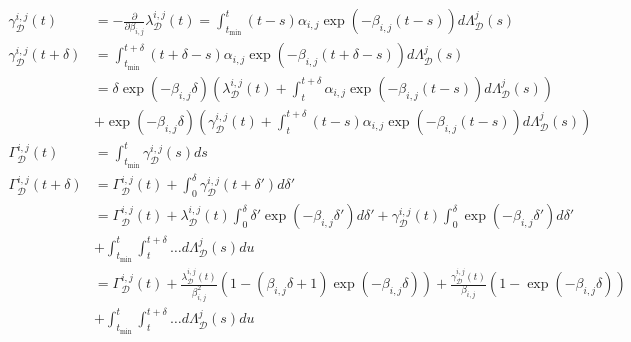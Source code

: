 \documentclass[honours,12pt]{unswthesis}
\numberwithin{equation}{section}
\begin{document}
\begin{equation*}
	\begin{align}
		\gamma_\mathcal{D}^{i,j}(t) &= -\frac{\partial}{\partial\beta_{i,j}}\lambda_\mathcal{D}^{i,j}(t) = \int_{t_\mathrm{min}}^t (t-s)\alpha_{i,j}\exp(-\beta_{i,j}(t-s))d\Lambda_\mathcal{D}^j(s) \\
		\gamma_\mathcal{D}^{i,j}(t+\delta) &= \int_{t_\mathrm{min}}^{t+\delta} (t+\delta-s)\alpha_{i,j}\exp(-\beta_{i,j}(t+\delta-s))d\Lambda_\mathcal{D}^j(s) \\
		&= \delta\exp(-\beta_{i,j}\delta) \left( \lambda_\mathcal{D}^{i,j}(t) + \int_{t}^{t+\delta} \alpha_{i,j}\exp(-\beta_{i,j}(t-s))d\Lambda_\mathcal{D}^j(s) \right) \\ &+ \exp(-\beta_{i,j}\delta) \left( \gamma_\mathcal{D}^{i,j}(t) + \int_{t}^{t+\delta} (t-s)\alpha_{i,j}\exp(-\beta_{i,j}(t-s))d\Lambda_\mathcal{D}^j(s) \right) \\
		\Gamma_\mathcal{D}^{i,j}(t) &= \int_{t_\mathrm{min}}^t\gamma_\mathcal{D}^{i,j}(s)ds \\
		\Gamma_\mathcal{D}^{i,j}(t+\delta) &= \Gamma_\mathcal{D}^{i,j}(t) + \int_0^\delta\gamma_\mathcal{D}^{i,j}(t+\delta')d\delta' \\
		&= \Gamma_\mathcal{D}^{i,j}(t) + \lambda_\mathcal{D}^{i,j}(t)\int_0^\delta \delta'\exp(-\beta_{i,j}\delta')d\delta' + \gamma_\mathcal{D}^{i,j}(t)\int_0^\delta \exp(-\beta_{i,j}\delta')d\delta' \\
		&+ \int_{t_\mathrm{min}}^t\int_t^{t+\delta}\ldots d\Lambda_\mathcal{D}^j(s)du \\
		&= \Gamma_\mathcal{D}^{i,j}(t) + \frac{\lambda_\mathcal{D}^{i,j}(t)}{\beta_{i,j}^2}(1-(\beta_{i,j}\delta+1)\exp(-\beta_{i,j}\delta)) + \frac{\gamma_\mathcal{D}^{i,j}(t)}{\beta_{i,j}}(1-\exp(-\beta_{i,j}\delta)) \\
		&+ \int_{t_\mathrm{min}}^t\int_t^{t+\delta}\ldots d\Lambda_\mathcal{D}^j(s)du \\
	\end{align}
\end{equation*}
\end{document}
